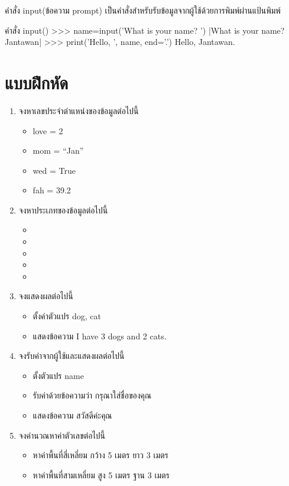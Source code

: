 คำสั่ง input(ข้อความ prompt) เป็นคำสั่งสำหรับรับข้อมูลจากผู้ใช้ด้วยการพิมพ์ผ่านแป้นพิมพ์ 

\begin{codelist}{คำสั่ง input()}{}
>>> name=input('What is your name? ')
|What is your name? Jantawan|
>>> print('Hello, ', name, end='.')
Hello, Jantawan.
\end{codelist}


\section{แบบฝึกหัด}

\begin{enumerate} 
\item จงหาเลขประจำตำแหน่งของข้อมูลต่อไปนี้
\begin{itemize}
\item love = 2
\item mom = “Jan”
\item wed = True
\item fah = 39.2 
\end{itemize}

\item จงหาประเภทของข้อมูลต่อไปนี้
\begin{itemize}
\item {}
\item {}
\item {}
\item {}
\item {}
\end{itemize}

\item จงแสดงผลต่อไปนี้
\begin{itemize}
\item ตั้งค่าตัวแปร dog, cat
\item แสดงข้อความ I have 3 dogs and 2 cats.
\end{itemize}

\item จงรับค่าจากผู้ใช้และแสดงผลต่อไปนี้
\begin{itemize}
\item ตั้งตัวแปร name 
\item รับค่าด้วยข้อความว่า กรุณาใส่ชื่อของคุณ
\item แสดงข้อความ สวัสดีค่ะคุณ
\end{itemize}



\item จงคำนวณหาค่าตัวเลขต่อไปนี้
\begin{itemize}
\item หาค่าพื้นที่สี่เหลี่ยม กว้าง 5 เมตร ยาว 3 เมตร
\item หาค่าพื้นที่สามเหลี่ยม สูง 5 เมตร ฐาน 3 เมตร
\end{itemize}



\end{enumerate}
